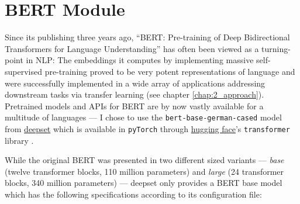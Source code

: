\begin{landscape}\centering
\end{landscape}


\section{BERT Module}

Since its publishing three years ago, ``BERT: Pre-training of Deep Bidirectional Transformers
for Language Understanding'' \citep{devlin2018bert} has often been viewed as a turning-point
in NLP: The embeddings it computes by implementing massive self-supervised pre-training
proved to be very potent representations of language and were successfully implemented in a
wide array of applications addressing downstream tasks via transfer learning (see chapter
\ref{chap:2_approach}). Pretrained models and APIs for BERT are by now vastly available
for a multitude of languages --- I chose to use the \texttt{bert-base-german-cased} model
from \href{https://deepset.ai/german-bert}{deepset} which is available in \texttt{pyTorch}
\citep{paszke2019pytorch} through \href{https://huggingface.co}{hugging face}'s
\texttt{transformer} library \cite{wolf2019transformers}.

While the original BERT was presented in two different sized variants --- \emph{base}
(twelve transformer blocks, 110 million parameters) and \emph{large} (24 transformer
blocks, 340 million parameters) --- deepset only provides a BERT base model which has
the following specifications according to its configuration file:


